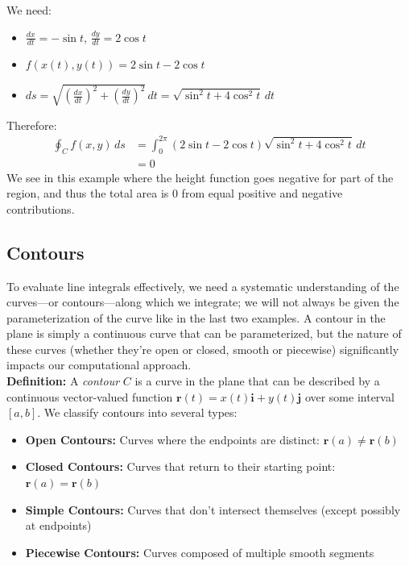 \begin{example}
\begin{solution}
\begin{enumerate}
    We need:
    \begin{itemize}
        \item $\frac{dx}{dt} = -\sin t$, $\frac{dy}{dt} = 2\cos t$
        \item $f(x(t),y(t)) = 2\sin t - 2\cos t$
        \item $ds = \sqrt{(\frac{dx}{dt})^2 + (\frac{dy}{dt})^2}\,dt = \sqrt{\sin^2 t + 4\cos^2 t}\,dt$
    \end{itemize}
    
    Therefore:
    \begin{align*}
        \oint_C f(x,y)\,ds &= \int_0^{2\pi} (2\sin t - 2\cos t)\sqrt{\sin^2 t + 4\cos^2 t}\,dt \\
        &= 0
    \end{align*}
	We see in this example where the height function goes negative for part of the region, and thus the total area is 0 from equal positive and negative contributions.
\end{enumerate}
\end{solution}
\end{example}
\exampleline

\subsection*{Contours}

\noindent To evaluate line integrals effectively, we need a systematic understanding of the curves—or contours—along which we integrate; we will not always be given the parameterization of the curve like in the last two examples. A contour in the plane is simply a continuous curve that can be parameterized, but the nature of these curves (whether they're open or closed, smooth or piecewise) significantly impacts our computational approach. \\

\noindent \textbf{Definition:} A \textit{contour} $C$ is a curve in the plane that can be described by a continuous vector-valued function $\mathbf{r}(t) = x(t)\mathbf{i} + y(t)\mathbf{j}$ over some interval $[a,b]$. We classify contours into several types:

\begin{itemize}
    \item \textbf{Open Contours:} Curves where the endpoints are distinct: $\mathbf{r}(a) \neq \mathbf{r}(b)$
    \item \textbf{Closed Contours:} Curves that return to their starting point: $\mathbf{r}(a) = \mathbf{r}(b)$
    \item \textbf{Simple Contours:} Curves that don't intersect themselves (except possibly at endpoints)
    \item \textbf{Piecewise Contours:} Curves composed of multiple smooth segments
\end{itemize}

